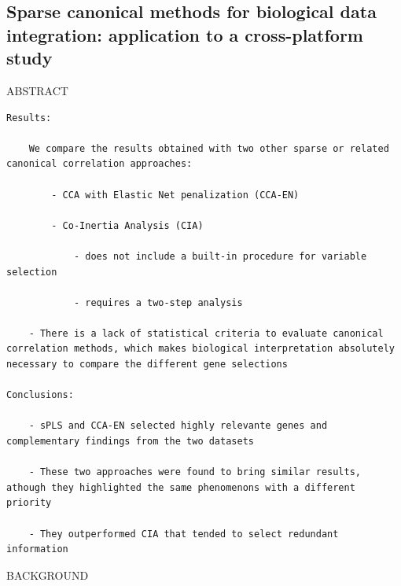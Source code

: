 \documentclass[
]{book}
\begin{document}
\hypertarget{sparse-canonical-methods-for-biological-data-integration-application-to-a-cross-platform-study}{%
\subsection{Sparse canonical methods for biological data integration: application to a cross-platform study}\label{sparse-canonical-methods-for-biological-data-integration-application-to-a-cross-platform-study}}

ABSTRACT

\begin{verbatim}
Results:

    We compare the results obtained with two other sparse or related canonical correlation approaches:

        - CCA with Elastic Net penalization (CCA-EN)

        - Co-Inertia Analysis (CIA)

            - does not include a built-in procedure for variable selection

            - requires a two-step analysis

    - There is a lack of statistical criteria to evaluate canonical correlation methods, which makes biological interpretation absolutely necessary to compare the different gene selections

Conclusions:

    - sPLS and CCA-EN selected highly relevante genes and complementary findings from the two datasets

    - These two approaches were found to bring similar results, athough they highlighted the same phenomenons with a different priority

    - They outperformed CIA that tended to select redundant information
\end{verbatim}

BACKGROUND
\end{document}
